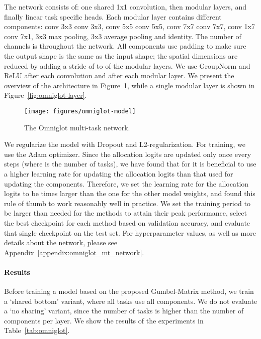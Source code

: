 \documentclass[conference]{IEEEtran}
\begin{document}
The network consists of: one shared 1x1 convolution, then  modular layers, and finally linear task specific heads. Each modular layer contains  different components: conv 3x3  conv 3x3, conv 5x5  conv 5x5, conv 7x7  conv 7x7, conv 1x7  conv 7x1, 3x3 max pooling, 3x3 average pooling and identity. The number of channels is  throughout the network. All components use padding to make sure the output shape is the same as the input shape; the spatial dimensions are reduced by adding a stride of  to  of the modular layers. We use GroupNorm \cite{GroupNorm} and ReLU after each convolution and after each modular layer. We present the overview of the architecture in Figure~\ref{fig:omniglot-model}, while a single modular layer is shown in Figure~\ref{fig:omniglot-layer}.

\begin{figure}[t]
\begin{center}
\texttt{[image: figures/omniglot-model]}
\end{center}
\caption{The Omniglot multi-task network.}\label{fig:omniglot-model}
\end{figure}

We regularize the model with Dropout and L2-regularization. For training, we use the Adam optimizer. Since the allocation logits are updated only once every  steps (where  is the number of tasks), we have found that for  it is beneficial to use a higher learning rate for updating the allocation logits than that used for updating the components. Therefore, we set the learning rate for the allocation logits to be  times larger than the one for the other model weights, and found this rule of thumb to work reasonably well in practice. We set the training period to be larger than needed for the methods to attain their peak performance, select the best checkpoint for each method based on validation accuracy, and evaluate that single checkpoint on the test set. For hyperparameter values, as well as more details about the network, please see Appendix~\ref{appendix:omniglot_mt_network}.

\paragraph{Results}

Before training a model based on the proposed Gumbel-Matrix method, we train a `shared bottom' variant, where all tasks use all components. We do not evaluate a `no sharing' variant, since the number of tasks  is higher than the number of components per layer.
We show the results of the experiments in Table~\ref{tab:omniglot}.
\end{document}
